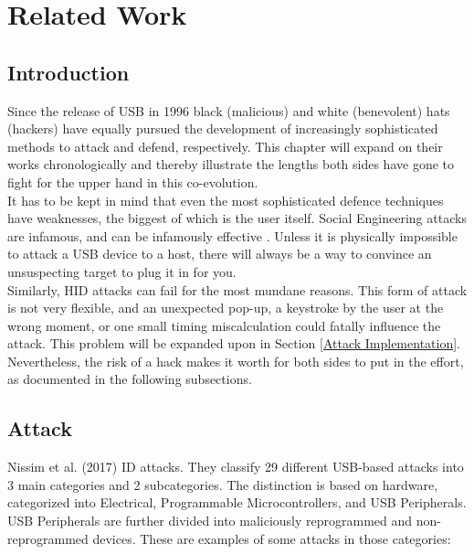 \chapter{Related Work}

\section{Introduction}

Since the release of USB in 1996 \cite{WaybackMachine2018} black (malicious) and white (benevolent) hats (hackers) have equally pursued the development of increasingly sophisticated methods to attack and defend, respectively. This chapter will expand on their works chronologically and thereby illustrate the lengths both sides have gone to fight for the upper hand in this co-evolution.\\
It has to be kept in mind that even the most sophisticated defence techniques have weaknesses, the biggest of which is the user itself. Social Engineering attacks are infamous, and can be infamously effective \cite{krombholzAdvancedSocialEngineering2015}. Unless it is physically impossible to attack a USB device to a host, there will always be a way to convince an unsuspecting target to plug it in for you.\\ 
Similarly, HID attacks can fail for the most mundane reasons. This form of attack is not very flexible, and an unexpected pop-up, a keystroke by the user at the wrong moment, or one small timing miscalculation could fatally influence the attack. This problem will be expanded upon in Section \ref{Attack Implementation}.\\
Nevertheless, the risk of a hack makes it worth for both sides to put in the effort, as documented in the following subsections.

\section{Attack}

Nissim et al. (2017) \cite{nissimUSBbasedAttacks2017} ID attacks. They classify 29 different USB-based attacks into 3 main categories and 2 subcategories. The distinction is based on hardware, categorized into Electrical, Programmable Microcontrollers, and USB Peripherals. USB Peripherals are further divided into maliciously reprogrammed and non-reprogrammed devices. These are examples of some attacks in those categories:

